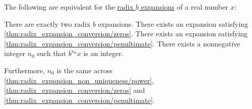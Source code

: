 \begin{corollary}\label{thm:radix_expansion_non_uniqueness}
  The following are equivalent for the \hyperref[def:real_number_radix_expansion]{radix \( b \) expansions} of a real number \( x \):
  \begin{thmenum}
     There are exactly two radix \( b \) expansions.
     There exists an expansion satisfying \cref{thm:radix_expansion_conversion/zeros}.
     There exists an expansion satisfying \cref{thm:radix_expansion_conversion/penultimate}.
     There exists a nonnegative integer \( n_0 \) such that \( b^{n_0} x \) is an integer.
  \end{thmenum}

  Furthermore, \( n_0 \) is the same across \cref{thm:radix_expansion_non_uniqueness/power}, \cref{thm:radix_expansion_conversion/zeros} and \cref{thm:radix_expansion_conversion/penultimate}.
\end{corollary}
